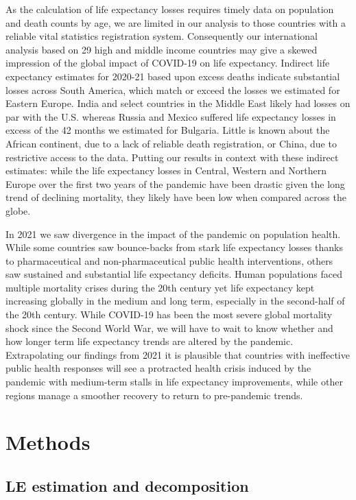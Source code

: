 \documentclass[12pt]{article}
\begin{document}
As the calculation of life expectancy losses requires timely data on population and death counts by age, we are limited in our analysis to those countries with a reliable vital statistics registration system. Consequently our international analysis based on 29 high and middle income countries may give a skewed impression of the global impact of COVID-19 on life expectancy. Indirect life expectancy estimates for 2020-21 based upon excess deaths \cite{Heuveline2022} indicate substantial losses across South America, which match or exceed the losses we estimated for Eastern Europe. India and select countries in the Middle East likely had losses on par with the U.S. whereas Russia and Mexico suffered life expectancy losses in excess of the 42 months we estimated for Bulgaria. Little is known about the African continent, due to a lack of reliable death registration, or China, due to restrictive access to the data. Putting our results in context with these indirect estimates: while the life expectancy losses in Central, Western and Northern Europe over the first two years of the pandemic have been drastic given the long trend of declining mortality, they likely have been low when compared across the globe.

In 2021 we saw divergence in the impact of the pandemic on population health. While some countries saw bounce-backs from stark life expectancy losses thanks to pharmaceutical and non-pharmaceutical public health interventions, others saw sustained and substantial life expectancy deficits. Human populations faced multiple mortality crises during the 20th century yet life expectancy kept increasing globally in the medium and long term, especially in the second-half of the 20th century. While COVID-19 has been the most severe global mortality shock since the Second World War, we will have to wait to know  whether and how longer term life expectancy trends are altered by the pandemic. Extrapolating our findings from 2021 it is plausible that countries with ineffective public health responses will see a protracted health crisis induced by the pandemic with medium-term stalls in life expectancy improvements, while other regions manage a smoother recovery to return to pre-pandemic trends.

\section*{Methods}

\subsection*{LE estimation and decomposition}
\end{document}
